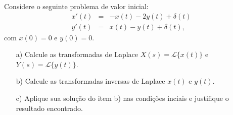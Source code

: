\begin{exer}
Considere o seguinte problema de valor inicial:
 \begin{eqnarray*}
x'(t)&=&- x(t) -2 y(t)+\delta(t)\\
y'(t)&=& x(t) - y(t)+\delta(t),
\end{eqnarray*}
com $x(0)=0$ e $y(0)=0$.
\begin{itemize}
       
 \item[a)] Calcule as transformadas de Laplace $X(s)=\mathcal{L}\{x(t)\}$ e $Y(s)=\mathcal{L}\{y(t)\}$.
 \item[b)] Calcule as transformadas inversas de Laplace $x(t)$ e $y(t)$.
 \item[c)] Aplique sua solução do item b) nas condições inciais e justifique o resultado encontrado.\\
\end{itemize}
\end{exer}